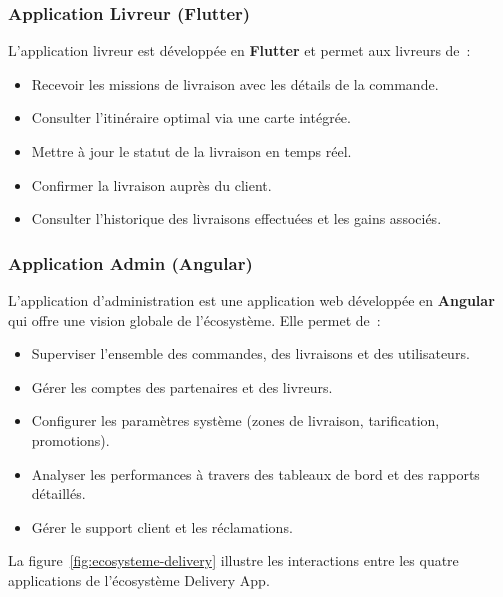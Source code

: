 \subsubsection{Application Livreur (Flutter)}
\label{subsubsec:app-livreur}

L'application livreur est développée en \textbf{Flutter} et permet aux livreurs de~:

\begin{itemize}
    \item Recevoir les missions de livraison avec les détails de la commande.
    \item Consulter l'itinéraire optimal via une carte intégrée.
    \item Mettre à jour le statut de la livraison en temps réel.
    \item Confirmer la livraison auprès du client.
    \item Consulter l'historique des livraisons effectuées et les gains associés.
\end{itemize}

\subsubsection{Application Admin (Angular)}
\label{subsubsec:app-admin}

L'application d'administration est une application web développée en \textbf{Angular} qui offre une vision globale de l'écosystème. Elle permet de~:

\begin{itemize}
    \item Superviser l'ensemble des commandes, des livraisons et des utilisateurs.
    \item Gérer les comptes des partenaires et des livreurs.
    \item Configurer les paramètres système (zones de livraison, tarification, promotions).
    \item Analyser les performances à travers des tableaux de bord et des rapports détaillés.
    \item Gérer le support client et les réclamations.
\end{itemize}

La figure~\ref{fig:ecosysteme-delivery} illustre les interactions entre les quatre applications de l'écosystème Delivery App.


